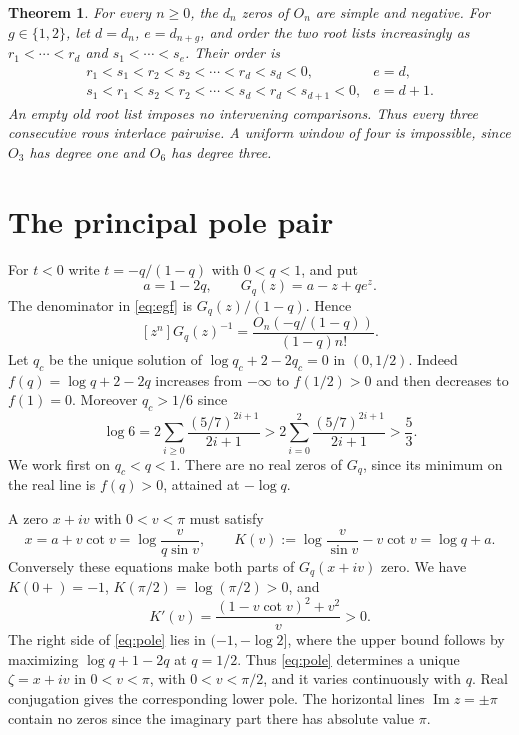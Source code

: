 \documentclass[11pt]{article}
\newtheorem{theorem}{Theorem}
\begin{document}
\begin{theorem}\label{thm:main}
For every \(n\ge0\), the \(d_n\) zeros of \(O_n\) are simple and negative. For \(g\in\{1,2\}\), let \(d=d_n\), \(e=d_{n+g}\), and order the two root lists increasingly as \(r_1<\cdots<r_d\) and \(s_1<\cdots<s_e\). Their order is
\[
\begin{array}{ll}
 r_1<s_1<r_2<s_2<\cdots<r_d<s_d<0,&e=d,\\[2pt]
 s_1<r_1<s_2<r_2<\cdots<s_d<r_d<s_{d+1}<0,&e=d+1 .
\end{array}
\]
An empty old root list imposes no intervening comparisons. Thus every three consecutive rows interlace pairwise. A uniform window of four is impossible, since \(O_3\) has degree one and \(O_6\) has degree three.
\end{theorem}

\section{The principal pole pair}

For \(t<0\) write \(t=-q/(1-q)\) with \(0<q<1\), and put
\[
 a=1-2q,\qquad G_q(z)=a-z+q e^z .
\]
The denominator in \eqref{eq:egf} is \(G_q(z)/(1-q)\). Hence
\begin{equation}\label{eq:true}
 [z^n]G_q(z)^{-1}=\frac{O_n(-q/(1-q))}{(1-q)n!}.
\end{equation}
Let \(q_c\) be the unique solution of \(\log q_c+2-2q_c=0\) in \((0,1/2)\).
Indeed \(f(q)=\log q+2-2q\) increases from \(-\infty\) to \(f(1/2)>0\) and then decreases to \(f(1)=0\). Moreover \(q_c>1/6\) since
\[
 \log 6=2\sum_{i\ge0}\frac{(5/7)^{2i+1}}{2i+1}
 >2\sum_{i=0}^2\frac{(5/7)^{2i+1}}{2i+1}>\frac53.
\]
We work first on \(q_c<q<1\). There are no real zeros of \(G_q\), since its minimum on the real line is \(f(q)>0\), attained at \(-\log q\).

A zero \(x+iv\) with \(0<v<\pi\) must satisfy
\begin{equation}\label{eq:pole}
 x=a+v\cot v=\log\frac{v}{q\sin v},\qquad
 K(v):=\log\frac{v}{\sin v}-v\cot v=\log q+a .
\end{equation}
Conversely these equations make both parts of \(G_q(x+iv)\) zero. We have \(K(0+)=-1\), \(K(\pi/2)=\log(\pi/2)>0\), and
\[
 K'(v)=\frac{(1-v\cot v)^2+v^2}{v}>0 .
\]
The right side of \eqref{eq:pole} lies in \((-1,-\log2]\), where the upper bound follows by maximizing \(\log q+1-2q\) at \(q=1/2\). Thus \eqref{eq:pole} determines a unique \(\zeta=x+iv\) in \(0<v<\pi\), with \(0<v<\pi/2\), and it varies continuously with \(q\). Real conjugation gives the corresponding lower pole. The horizontal lines \(\operatorname{Im}z=\pm\pi\) contain no zeros since the imaginary part there has absolute value \(\pi\).
\end{document}
